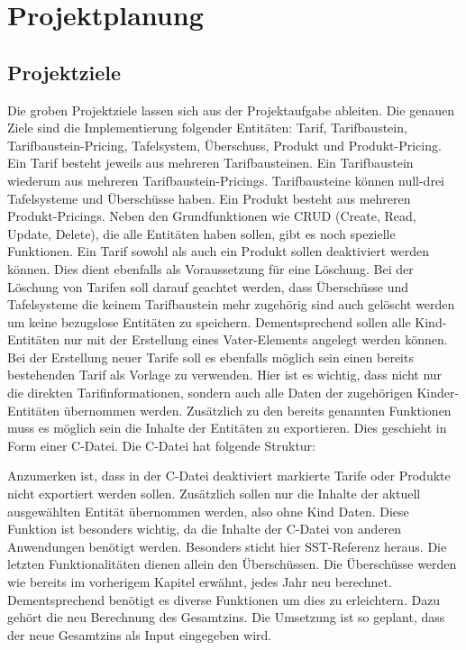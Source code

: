\chapter{Projektplanung}\label{ch:data}
\section{Projektziele}
Die groben Projektziele lassen sich aus der Projektaufgabe ableiten. 
Die genauen Ziele sind die Implementierung folgender Entitäten: Tarif, Tarifbaustein, Tarifbaustein-Pricing, Tafelsystem, Überschuss, Produkt und Produkt-Pricing.
Ein Tarif besteht jeweils aus mehreren Tarifbausteinen. Ein Tarifbaustein wiederum aus mehreren Tarifbaustein-Pricings. Tarifbausteine können null-drei Tafelsysteme und Überschüsse haben.
Ein Produkt besteht aus mehreren Produkt-Pricings. Neben den Grundfunktionen wie CRUD (Create, Read, Update, Delete), die alle Entitäten haben sollen, gibt es noch spezielle Funktionen.
Ein Tarif sowohl als auch ein Produkt sollen deaktiviert werden können. Dies dient ebenfalls als Voraussetzung für eine Löschung. Bei der Löschung von Tarifen soll darauf geachtet werden, dass Überschüsse und
Tafelsysteme die keinem Tarifbaustein mehr zugehörig sind auch gelöscht werden um keine bezugslose Entitäten zu speichern. Dementsprechend sollen alle Kind-Entitäten nur mit der Erstellung eines Vater-Elements angelegt werden können.
Bei der Erstellung neuer Tarife soll es ebenfalls möglich sein einen bereits bestehenden Tarif als Vorlage zu verwenden. Hier ist es wichtig, dass nicht nur die direkten Tarifinformationen, 
sondern auch alle Daten der zugehörigen Kinder-Entitäten übernommen werden.
Zusätzlich zu den bereits genannten Funktionen muss es möglich sein 
die Inhalte der Entitäten zu exportieren. Dies geschieht in Form einer C-Datei. Die C-Datei hat folgende Struktur: 

Anzumerken ist, dass in der C-Datei deaktiviert markierte Tarife oder Produkte nicht exportiert werden sollen. Zusätzlich sollen nur die Inhalte der aktuell ausgewählten Entität übernommen werden, also ohne Kind Daten.
Diese Funktion ist besonders wichtig, da die Inhalte der C-Datei von anderen Anwendungen benötigt werden. Besonders sticht hier SST-Referenz heraus.
Die letzten Funktionalitäten dienen allein den Überschüssen. Die Überschüsse werden wie bereits im vorherigem Kapitel erwähnt, jedes Jahr neu berechnet.
Dementsprechend benötigt es diverse Funktionen um dies zu erleichtern. Dazu gehört die neu Berechnung des Gesamtzins. Die Umsetzung ist so geplant, dass der neue Gesamtzins als Input eingegeben wird.
